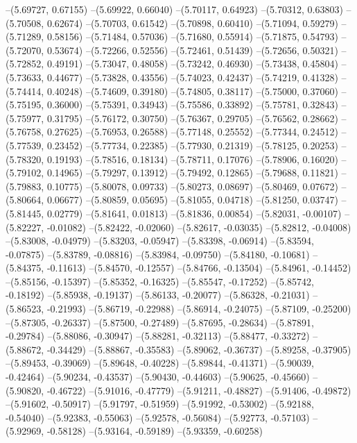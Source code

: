 --(5.69727, 0.67155)
--(5.69922, 0.66040)
--(5.70117, 0.64923)
--(5.70312, 0.63803)
--(5.70508, 0.62674)
--(5.70703, 0.61542)
--(5.70898, 0.60410)
--(5.71094, 0.59279)
--(5.71289, 0.58156)
--(5.71484, 0.57036)
--(5.71680, 0.55914)
--(5.71875, 0.54793)
--(5.72070, 0.53674)
--(5.72266, 0.52556)
--(5.72461, 0.51439)
--(5.72656, 0.50321)
--(5.72852, 0.49191)
--(5.73047, 0.48058)
--(5.73242, 0.46930)
--(5.73438, 0.45804)
--(5.73633, 0.44677)
--(5.73828, 0.43556)
--(5.74023, 0.42437)
--(5.74219, 0.41328)
--(5.74414, 0.40248)
--(5.74609, 0.39180)
--(5.74805, 0.38117)
--(5.75000, 0.37060)
--(5.75195, 0.36000)
--(5.75391, 0.34943)
--(5.75586, 0.33892)
--(5.75781, 0.32843)
--(5.75977, 0.31795)
--(5.76172, 0.30750)
--(5.76367, 0.29705)
--(5.76562, 0.28662)
--(5.76758, 0.27625)
--(5.76953, 0.26588)
--(5.77148, 0.25552)
--(5.77344, 0.24512)
--(5.77539, 0.23452)
--(5.77734, 0.22385)
--(5.77930, 0.21319)
--(5.78125, 0.20253)
--(5.78320, 0.19193)
--(5.78516, 0.18134)
--(5.78711, 0.17076)
--(5.78906, 0.16020)
--(5.79102, 0.14965)
--(5.79297, 0.13912)
--(5.79492, 0.12865)
--(5.79688, 0.11821)
--(5.79883, 0.10775)
--(5.80078, 0.09733)
--(5.80273, 0.08697)
--(5.80469, 0.07672)
--(5.80664, 0.06677)
--(5.80859, 0.05695)
--(5.81055, 0.04718)
--(5.81250, 0.03747)
--(5.81445, 0.02779)
--(5.81641, 0.01813)
--(5.81836, 0.00854)
--(5.82031, -0.00107)
--(5.82227, -0.01082)
--(5.82422, -0.02060)
--(5.82617, -0.03035)
--(5.82812, -0.04008)
--(5.83008, -0.04979)
--(5.83203, -0.05947)
--(5.83398, -0.06914)
--(5.83594, -0.07875)
--(5.83789, -0.08816)
--(5.83984, -0.09750)
--(5.84180, -0.10681)
--(5.84375, -0.11613)
--(5.84570, -0.12557)
--(5.84766, -0.13504)
--(5.84961, -0.14452)
--(5.85156, -0.15397)
--(5.85352, -0.16325)
--(5.85547, -0.17252)
--(5.85742, -0.18192)
--(5.85938, -0.19137)
--(5.86133, -0.20077)
--(5.86328, -0.21031)
--(5.86523, -0.21993)
--(5.86719, -0.22988)
--(5.86914, -0.24075)
--(5.87109, -0.25200)
--(5.87305, -0.26337)
--(5.87500, -0.27489)
--(5.87695, -0.28634)
--(5.87891, -0.29784)
--(5.88086, -0.30947)
--(5.88281, -0.32113)
--(5.88477, -0.33272)
--(5.88672, -0.34429)
--(5.88867, -0.35583)
--(5.89062, -0.36737)
--(5.89258, -0.37905)
--(5.89453, -0.39069)
--(5.89648, -0.40228)
--(5.89844, -0.41371)
--(5.90039, -0.42464)
--(5.90234, -0.43537)
--(5.90430, -0.44603)
--(5.90625, -0.45660)
--(5.90820, -0.46722)
--(5.91016, -0.47779)
--(5.91211, -0.48827)
--(5.91406, -0.49872)
--(5.91602, -0.50917)
--(5.91797, -0.51959)
--(5.91992, -0.53002)
--(5.92188, -0.54040)
--(5.92383, -0.55063)
--(5.92578, -0.56084)
--(5.92773, -0.57103)
--(5.92969, -0.58128)
--(5.93164, -0.59189)
--(5.93359, -0.60258)

